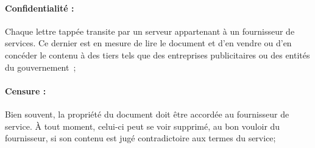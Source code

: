 

\paragraph{Confidentialité :} Chaque lettre tappée transite par un serveur
appartenant à un fournisseur de services. Ce dernier est en mesure de lire le
document et d'en vendre ou d'en concéder le contenu à des tiers tels que des
entreprises publicitaires ou des entités du gouvernement~\cite{gellman2013us};

\paragraph{Censure :} Bien souvent, la propriété du document doit être accordée
au fournisseur de service. À tout moment, celui-ci peut se voir supprimé, au bon
vouloir du fournisseur, si son contenu est jugé contradictoire aux termes du
service;

